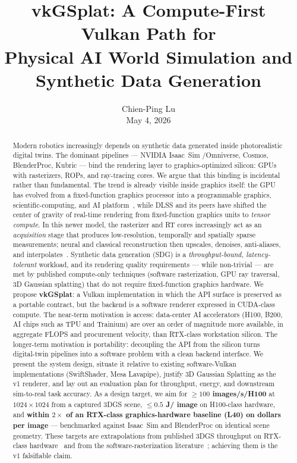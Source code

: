 \documentclass[10pt,journal]{IEEEtran}
\title{vkGSplat: A Compute-First Vulkan Path for\\Physical AI World Simulation and Synthetic Data Generation}
\author{%
    Chien-Ping Lu\\[0.35em]
    \normalsize May 4, 2026%
}
\begin{document}
\maketitle

\begin{abstract}
Modern robotics increasingly depends on synthetic data generated inside
photorealistic digital twins. The dominant pipelines --- NVIDIA Isaac~Sim
\slash Omniverse, Cosmos, BlenderProc, Kubric --- bind the rendering layer to
graphics-optimized silicon: GPUs with rasterizers, ROPs, and ray-tracing
cores. We argue that this binding is incidental rather than fundamental.
The trend is already visible inside graphics itself: the GPU has evolved
from a fixed-function graphics processor into a programmable graphics,
scientific-computing, and AI platform~\cite{dally2021gpu}, while DLSS and
its peers have shifted the center of gravity of real-time rendering from
fixed-function graphics units to \emph{tensor compute}. In this newer
model, the rasterizer and RT cores increasingly act as an
\emph{acquisition} stage that produces low-resolution, temporally and
spatially sparse measurements; neural and classical reconstruction then
upscales, denoises, anti-aliases, and
interpolates~\cite{nvidia-dlss,liu2020nsrr,nvidia-dlss3,schied2017svgf,bitterli2020restir}.
Synthetic data generation (SDG) is a \emph{throughput-bound,
latency-tolerant} workload, and its rendering quality requirements --- while
non-trivial --- are met by published compute-only techniques (software
rasterization, GPU ray traversal, 3D Gaussian splatting) that do not require
fixed-function graphics hardware. We propose \textbf{vkGSplat}: a Vulkan
implementation in which the API surface is preserved as a portable contract,
but the backend is a software renderer expressed in CUDA-class compute. The
near-term motivation is access: data-center AI accelerators (H100, B200, AI
chips such as TPU and Trainium) are over an order of magnitude more available,
in aggregate FLOPS and procurement velocity, than RTX-class workstation
silicon. The longer-term motivation is portability: decoupling the API from
the silicon turns digital-twin pipelines into a software problem with a clean
backend interface. We present the system design, situate it relative to
existing software-Vulkan implementations (SwiftShader, Mesa Lavapipe), justify
3D Gaussian Splatting as the v1 renderer, and lay out an evaluation plan for
throughput, energy, and downstream sim-to-real task accuracy. As a
design target, we aim for \textbf{$\geq 100$ images\slash s\slash H100} at
$1024{\times}1024$ from a captured 3DGS scene, \textbf{$\leq 0.5$ J\slash
image} on H100-class hardware, and \textbf{within $2{\times}$ of an
RTX-class graphics-hardware baseline (L40) on dollars per image} ---
benchmarked against Isaac~Sim and BlenderProc on identical scene
geometry. These targets are extrapolations from published 3DGS
throughput on RTX-class hardware~\cite{kerbl20233dgs} and from the
software-rasterization literature~\cite{laine2011software}; achieving
them is the v1 falsifiable claim.
\end{abstract}
\end{document}
